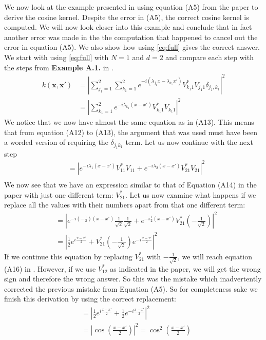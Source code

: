 \documentclass{article}
\begin{document}
We now look at the example presented in \cite{maria} using equation (A5) from the paper to derive the cosine kernel. Despite the error in (A5), the correct cosine kernel is computed. We will now look closer into this example and conclude that in fact another error was made in the the computation that happened to cancel out the error in equation (A5). We also show how using \autoref{eq:full} gives the correct answer. We start with using \autoref{eq:full} with $N=1$ and $d=2$ and compare each step with the steps from \textbf{Example A.1.} in \cite{maria}.
\begin{align}
	k(\boldsymbol{x},\boldsymbol{x'}) &= \left|\sum_{j_1=1}^2\sum_{k_1=1}^2e^{-i(\lambda_{j_1}x-\lambda_{k_1}x')}V^*_{{k_1}1}V_{{j_1}1}\delta_{j_1,k_1}\right|^2 \\
	&= \left|\sum_{k_1=1}^2e^{-i\lambda_{k_1}(x-x')}V^*_{{k_1}1}V_{{k_1}1}\right|^2
\end{align}
We notice that we now have almost the same equation as in (A13). This means that from equation (A12) to (A13), the argument that was used must have been a worded version of requiring the $\delta_{j_1k_1}$ term. Let us now continue with the next step
 \begin{align}
	&= \left|e^{-i\lambda_1(x-x')}V^*_{11}V_{11}+e^{-i\lambda_2(x-x')}V^*_{21}V_{21}\right|^2\\
\end{align}
We now see that we have an expression similar to that of Equation (A14) in the paper with just one different term: $V^*_{21}$. Let us now examine what happens if we replace all the values with their numbers apart from that one different term:	
\begin{align}
	&= \left|e^{-i\left(-\frac{1}{2}\right)(x-x')}\frac{1}{\sqrt{2}}\frac{1}{\sqrt{2}}+e^{-i{\frac{1}{2}}(x-x')}V^*_{21}\left(-\frac{1}{\sqrt{2}}\right)\right|^2 \\
	&= \left|\frac{1}{2}e^{i\frac{x-x'}{2}}+V^*_{21}\left(-\frac{1}{\sqrt{2}}\right)e^{-i\frac{x-x'}{2}}\right|^2
\end{align}
If we continue this equation by replacing $V^*_{21}$ with $-\frac{1}{\sqrt{2}}$, we will reach equation (A16) in \cite{maria}. However, if we use $V^*_{12}$ as indicated in the paper, we will get the wrong sign and therefore the wrong answer. So this was the mistake which inadvertently corrected the previous mistake from Equation (A5). So for completeness sake we finish this derivation by using the correct replacement:
 \begin{align}
	&= \left|\frac{1}{2}e^{i\frac{x-x'}{2}}+\frac{1}{2}e^{-i\frac{x-x'}{2}}\right|^2 \\
	&= \left|\cos\left(\frac{x-x'}{2}\right)\right|^2 =\cos^2\left(\frac{x-x'}{2}\right)
\end{align}
\end{document}
